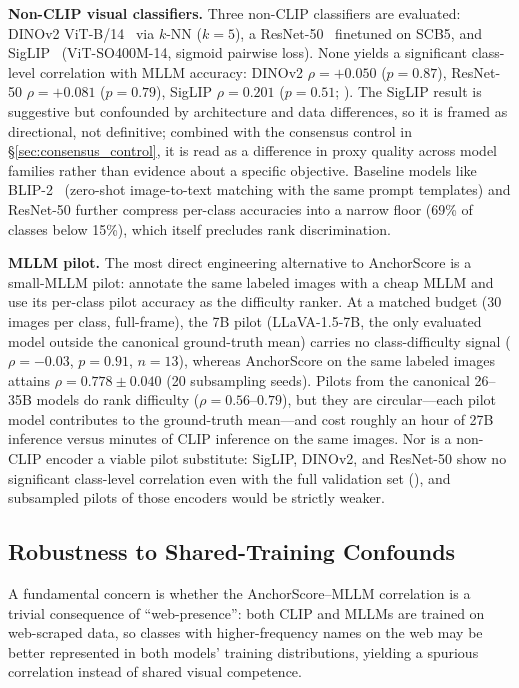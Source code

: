 \documentclass[11pt,a4paper]{article}
\begin{document}
\textbf{Non-CLIP visual classifiers.} Three non-CLIP classifiers are evaluated: DINOv2 ViT-B/14~\cite{oquab2024dinov2} via $k$-NN ($k=5$), a ResNet-50~\cite{he2016deep} finetuned on SCB5, and SigLIP~\cite{zhai2023sigmoid} (ViT-SO400M-14, sigmoid pairwise loss). None yields a significant class-level correlation with MLLM accuracy: DINOv2 $\rho=+0.050$ ($p=0.87$), ResNet-50 $\rho=+0.081$ ($p=0.79$), SigLIP $\rho=0.201$ ($p=0.51$; ). The SigLIP result is suggestive but confounded by architecture and data differences, so it is framed as directional, not definitive; combined with the consensus control in \S\ref{sec:consensus_control}, it is read as a difference in proxy quality across model families rather than evidence about a specific objective. Baseline models like BLIP-2~\cite{li2023blip2} (zero-shot image-to-text matching with the same prompt templates) and ResNet-50 further compress per-class accuracies into a narrow floor (69\% of classes below 15\%), which itself precludes rank discrimination.

\textbf{MLLM pilot.} The most direct engineering alternative to AnchorScore is a small-MLLM pilot: annotate the same labeled images with a cheap MLLM and use its per-class pilot accuracy as the difficulty ranker. At a matched budget (30 images per class, full-frame), the 7B pilot (LLaVA-1.5-7B, the only evaluated model outside the canonical ground-truth mean) carries no class-difficulty signal ($\rho=-0.03$, $p=0.91$, $n=13$), whereas AnchorScore on the same labeled images attains $\rho=0.778\pm0.040$ (20 subsampling seeds). Pilots from the canonical 26--35B models do rank difficulty ($\rho=0.56$--$0.79$), but they are circular---each pilot model contributes to the ground-truth mean---and cost roughly an hour of 27B inference versus minutes of CLIP inference on the same images. Nor is a non-CLIP encoder a viable pilot substitute: SigLIP, DINOv2, and ResNet-50 show no significant class-level correlation even with the full validation set (), and subsampled pilots of those encoders would be strictly weaker.

\subsection{Robustness to Shared-Training Confounds}
\label{sec:shared_train}

A fundamental concern is whether the AnchorScore--MLLM correlation is a trivial consequence of ``web-presence'': both CLIP and MLLMs are trained on web-scraped data, so classes with higher-frequency names on the web may be better represented in both models' training distributions, yielding a spurious correlation instead of shared visual competence.
\end{document}
